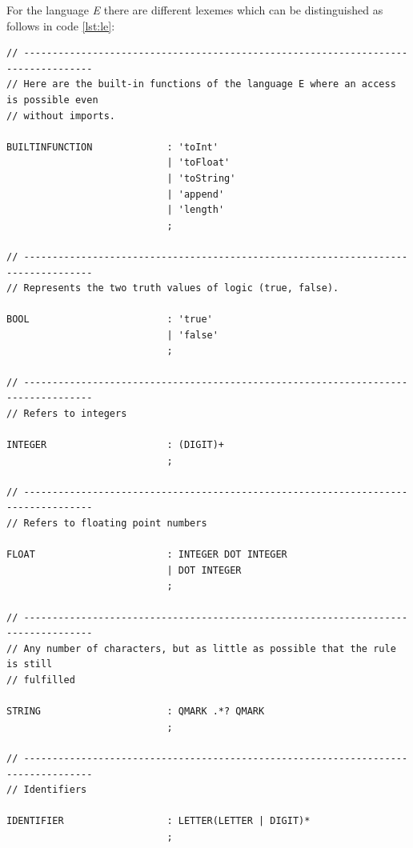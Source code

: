 For the language \emph{E} there are different lexemes which can be distinguished as follows in code \ref{lst:le}:


\begin{lstlisting}[frame=htrbl, caption={Lexer rules of grammar {\ttfamily E}}, label={lst:le}, basicstyle=\scriptsize]
// ----------------------------------------------------------------------------------
// Here are the built-in functions of the language E where an access is possible even
// without imports.

BUILTINFUNCTION             : 'toInt'
                            | 'toFloat'
                            | 'toString'
                            | 'append'
                            | 'length'
                            ;

// ----------------------------------------------------------------------------------
// Represents the two truth values of logic (true, false).

BOOL                        : 'true'
                            | 'false'
                            ;

// ----------------------------------------------------------------------------------
// Refers to integers

INTEGER                     : (DIGIT)+
                            ;

// ----------------------------------------------------------------------------------
// Refers to floating point numbers

FLOAT                       : INTEGER DOT INTEGER
                            | DOT INTEGER
                            ;

// ----------------------------------------------------------------------------------
// Any number of characters, but as little as possible that the rule is still 
// fulfilled

STRING                      : QMARK .*? QMARK
                            ;

// ----------------------------------------------------------------------------------
// Identifiers

IDENTIFIER                  : LETTER(LETTER | DIGIT)*
                            ;


\end{lstlisting}
